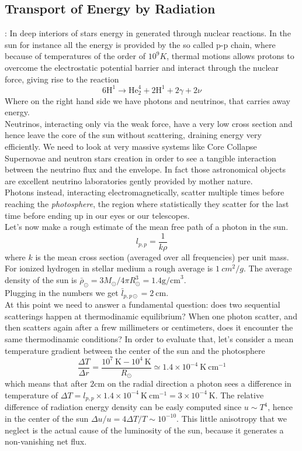 \documentclass[11pt]{article}
\begin{document}
\subsection{Transport of Energy by Radiation}
:
In deep interiors of stars energy in generated through nuclear reactions. In the sun for instance all the energy is provided by the so called p-p chain, where because of temperatures of the order of $10^9 K$, thermal motions allows protons to overcome the electrostatic potential barrier and interact through the nuclear force, giving rise to the reaction
\begin{equation}\label{ppchain}
	6 \mathrm{H}^1 \to \mathrm{He}^4_2 + 2 \mathrm{H}^1 + 2 \gamma + 2 \nu
\end{equation}
Where on the right hand side we have photons and neutrinos, that carries away energy. \\
Neutrinos, interacting only via the weak force, have a very low cross section and hence leave the core of the sun without scattering, draining energy very efficiently. We need to look at very massive systems like Core Collapse Supernovae and neutron stars creation in order to see a tangible interaction between the neutrino flux and the envelope. In fact those astronomical objects are excellent neutrino laboratories gently provided by mother nature. \\
Photons instead, interacting electromagnetically, scatter multiple times before reaching the \textit{photosphere}, the region where statistically they scatter for the last time before ending up in our eyes or our telescopes. \\
Let's now make a rough estimate of the mean free path of a photon in the sun. 
\begin{equation}\label{mfp}
	l_{p,p}=\frac{1}{k \rho}
\end{equation}
where $k$ is the mean cross section (averaged over all frequencies) per unit mass. For ionized hydrogen in stellar medium a rough average is $1 \ cm^2/g$. The average density of the sun is $\bar\rho_{\odot}=3M_{\odot}/4 \pi R_{\odot}^3= 1.4 \mathrm{g /cm}^3$. \\
Plugging in the numbers we get $\bar l_{p,p \odot}=2 \  \mathrm{cm}$. \\
At this point we need to answer a fundamental question: does two sequential scatterings happen at thermodinamic equilibrium? When one photon scatter, and then scatters again after a frew millimeters or centimeters, does it encounter the same thermodinamic conditions? In order to evaluate that, let's consider a mean temperature gradient between the center of the sun and the photosphere
$$
\frac{\Delta T}{\Delta r} = \frac{10^7 \ \mathrm{K}-10^4  \ \mathrm{K}}{R_{\odot}} \simeq 1.4 \times 10^{-4} \  \mathrm{K} \ \mathrm{cm} ^{-1}
$$
which means that after $2 \mathrm{cm}$ on the radial direction a photon sees a difference in temperature of $\Delta T = l_{p,p} \times 1.4 \times 10^{-4}  \  \mathrm{K} \ \mathrm{cm} ^{-1}= 3 \times 10^{-4} \  \mathrm{K}$. The relative difference of radiation energy density can be easly computed since $u \sim T^4$, hence in the center of the sun $\Delta u/u=4 \Delta T / T \sim 10^{-10}$. This little anisotropy that we neglect is the actual cause of the luminosity of the sun, because it generates a non-vanishing net flux.
\end{document}
